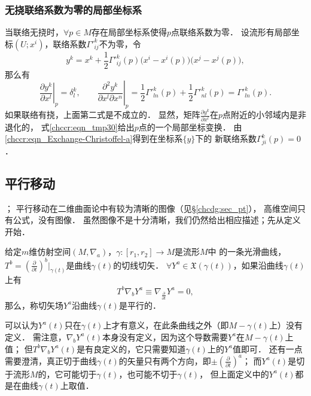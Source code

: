 \subsubsection{无挠联络系数为零的局部坐标系}\label{chccr:sec_0-Christoffel}
当联络无挠时，$\forall p\in M$存在局部坐标系使得$p$点联络系数为零．
设流形有局部坐标$(U;x^i)$，联络系数$\Gamma'^k_{ij}$不为零，令
\begin{equation}\label{chccr:eqn_tmp30}
    y^k=x^k+\frac{1}{2} \Gamma'^k_{ij}(p) \bigl(x^i- x^i(p)\bigr) \bigl(x^j- x^j(p)\bigr) ,
\end{equation}
那么有
\begin{equation}
    \left. \frac{\partial y^k}{\partial x^l} \right|_{p} = \delta ^k_l, \qquad
    \left. \frac{\partial^2 y^k}{\partial x^l \partial x^n} \right|_{p}
    =\frac{1}{2}\Gamma'^k_{l n}(p) + \frac{1}{2}\Gamma'^k_{n l}(p)  = \Gamma'^k_{l n}(p) .
\end{equation}
如果联络有挠，上面第二式是不成立的．
显然，矩阵$\frac{\partial y^k}{\partial x^l}$在$p$点附近的小邻域内是非退化的，
式\eqref{chccr:eqn_tmp30}给出$p$点的一个局部坐标变换．
由\eqref{chccr:eqn_Exchange-Christoffel-a}得到在坐标系$\{y\}$下的
新联络系数$\Gamma^{k}_{ji}(p)=0$．



\subsection{平行移动}\label{chccr:sec_pxyd}
；
平行移动在二维曲面论中有较为清晰的图像（见\S\ref{chcdg:sec_pt}），
高维空间只有公式，没有图像．
虽然图像不是十分清晰，我们仍然给出相应描述；先从定义开始．
\begin{definition}\label{chccr:def_px}
    给定$m$维仿射空间$(M,\nabla_a)$，$\gamma:[r_1,r_2]\to M$是流形$M$中
    的一条光滑曲线，$T^b=(\frac{\partial}{\partial t})^b|_{\gamma(t)}$是曲线$\gamma(t)$的切线切矢．
    $\forall Y^a \in \mathfrak{X}(\gamma(t))$，如果沿曲线$\gamma(t)$上有
    \begin{equation}\label{chccr:eqn_px}
        T^b \nabla _b Y^a \equiv \nabla_{\frac{\partial}{\partial t}} Y^a =0 ,
    \end{equation}
    那么，称切矢场$Y^a$沿曲线$\gamma(t)$是{\heiti 平行}的．
\end{definition}
可以认为$Y^a(t)$只在$\gamma(t)$上才有意义，在此条曲线之外（即$M-\gamma(t)$上）没有定义．
需注意，$\nabla _b Y^a(t)$本身没有定义，因为这个导数需要$Y^a$在$M-\gamma(t)$上值；
但$T^b \nabla _b Y^a(t)$是有良定义的，它只需要知道$\gamma(t)$上的$Y^a$值即可．
还有一点需要澄清，真正切于曲线$\gamma(t)$的矢量只有两个方向，即$\pm(\frac{\partial}{\partial t})^a$；
而$Y^a(t)$是切于流形$M$的，它可能切于$\gamma(t)$，也可能不切于$\gamma(t)$，
但上面定义中的$Y^a(t)$都是在曲线$\gamma(t)$上取值．


